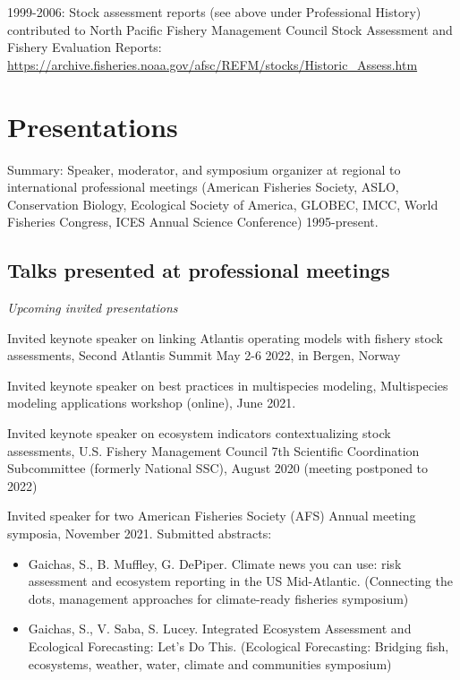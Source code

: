 \documentclass[11pt, a4paper]{awesome-cv}
\begin{document}
1999-2006: Stock assessment reports (see above under Professional
History) contributed to North Pacific Fishery Management Council Stock
Assessment and Fishery Evaluation Reports:
\url{https://archive.fisheries.noaa.gov/afsc/REFM/stocks/Historic_Assess.htm}

\hypertarget{presentations}{%
\section{Presentations}\label{presentations}}

Summary: Speaker, moderator, and symposium organizer at regional to
international professional meetings (American Fisheries Society, ASLO,
Conservation Biology, Ecological Society of America, GLOBEC, IMCC, World
Fisheries Congress, ICES Annual Science Conference) 1995-present.

\hypertarget{talks-presented-at-professional-meetings}{%
\subsection{Talks presented at professional
meetings}\label{talks-presented-at-professional-meetings}}

\emph{Upcoming invited presentations}

Invited keynote speaker on linking Atlantis operating models with
fishery stock assessments, Second Atlantis Summit May 2-6 2022, in
Bergen, Norway

Invited keynote speaker on best practices in multispecies modeling,
Multispecies modeling applications workshop (online), June 2021.

Invited keynote speaker on ecosystem indicators contextualizing stock
assessments, U.S. Fishery Management Council 7th Scientific Coordination
Subcommittee (formerly National SSC), August 2020 (meeting postponed to
2022)

Invited speaker for two American Fisheries Society (AFS) Annual meeting
symposia, November 2021. Submitted abstracts:

\begin{itemize}
\item
  Gaichas, S., B. Muffley, G. DePiper. Climate news you can use: risk
  assessment and ecosystem reporting in the US Mid-Atlantic. (Connecting
  the dots, management approaches for climate-ready fisheries symposium)
\item
  Gaichas, S., V. Saba, S. Lucey. Integrated Ecosystem Assessment and
  Ecological Forecasting: Let's Do This. (Ecological Forecasting:
  Bridging fish, ecosystems, weather, water, climate and communities
  symposium)
\end{itemize}
\end{document}
